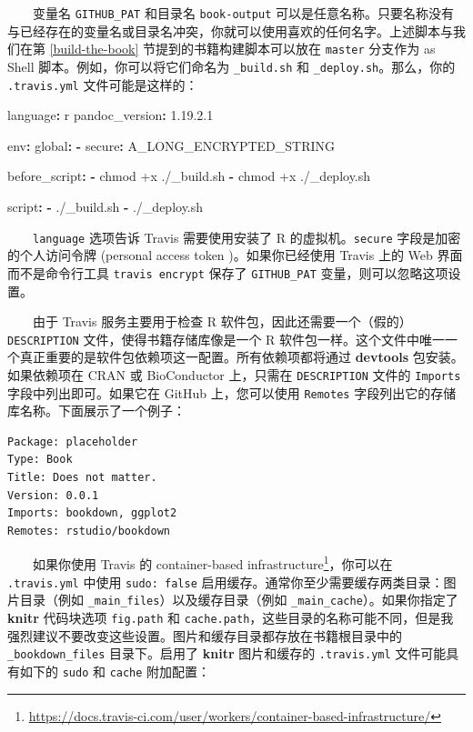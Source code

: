\documentclass[
  12pt,
]{krantz}
\newenvironment{Shaded}{\begin{snugshade}}{\end{snugshade}}
\newcommand{\AttributeTok}[1]{\textcolor[rgb]{0.77,0.63,0.00}{#1}}
\newcommand{\FloatTok}[1]{\textcolor[rgb]{0.00,0.00,0.81}{#1}}
\newcommand{\FunctionTok}[1]{\textcolor[rgb]{0.00,0.00,0.00}{#1}}
\newcommand{\KeywordTok}[1]{\textcolor[rgb]{0.13,0.29,0.53}{\textbf{#1}}}
\renewcommand{\href}[2]{#2\footnote{\url{#1}}}
\theoremstyle{definition}
\theoremstyle{definition}
\theoremstyle{definition}
\theoremstyle{definition}
\theoremstyle{remark}
\begin{document}
  变量名 \texttt{GITHUB\_PAT} 和目录名 \texttt{book-output} 可以是任意名称。只要名称没有与已经存在的变量名或目录名冲突，你就可以使用喜欢的任何名字。上述脚本与我们在第 \ref{build-the-book} 节提到的书籍构建脚本可以放在 \texttt{master} 分支作为 as Shell 脚本。例如，你可以将它们命名为 \texttt{\_build.sh} 和 \texttt{\_deploy.sh}。那么，你的 \texttt{.travis.yml} 文件可能是这样的：

\begin{Shaded}
\begin{Highlighting}[]
\FunctionTok{language}\KeywordTok{:}\AttributeTok{ r}
\FunctionTok{pandoc\_version}\KeywordTok{:}\AttributeTok{ }\FloatTok{1.19.2.1}

\FunctionTok{env}\KeywordTok{:}
\AttributeTok{  }\FunctionTok{global}\KeywordTok{:}
\AttributeTok{    }\KeywordTok{{-}}\AttributeTok{ }\FunctionTok{secure}\KeywordTok{:}\AttributeTok{ A\_LONG\_ENCRYPTED\_STRING}

\FunctionTok{before\_script}\KeywordTok{:}
\AttributeTok{  }\KeywordTok{{-}}\AttributeTok{ chmod +x ./\_build.sh}
\AttributeTok{  }\KeywordTok{{-}}\AttributeTok{ chmod +x ./\_deploy.sh}

\FunctionTok{script}\KeywordTok{:}
\AttributeTok{  }\KeywordTok{{-}}\AttributeTok{ ./\_build.sh}
\AttributeTok{  }\KeywordTok{{-}}\AttributeTok{ ./\_deploy.sh}
\end{Highlighting}
\end{Shaded}

  \texttt{language} 选项告诉 Travis 需要使用安装了 R 的虚拟机。\texttt{secure} 字段是加密的个人访问令牌 (personal access token )。如果你已经使用 Travis 上的 Web 界面而不是命令行工具 \texttt{travis\ encrypt} 保存了 \texttt{GITHUB\_PAT} 变量，则可以忽略这项设置。

  由于 Travis 服务主要用于检查 R 软件包，因此还需要一个（假的）\texttt{DESCRIPTION} 文件，使得书籍存储库像是一个 R 软件包一样。这个文件中唯一一个真正重要的是软件包依赖项这一配置。所有依赖项都将通过 \textbf{devtools} 包安装。如果依赖项在 CRAN 或 BioConductor 上，只需在 \texttt{DESCRIPTION} 文件的 \texttt{Imports} 字段中列出即可。如果它在 GitHub 上，您可以使用 \texttt{Remotes} 字段列出它的存储库名称。下面展示了一个例子：

\begin{verbatim}
Package: placeholder
Type: Book
Title: Does not matter.
Version: 0.0.1
Imports: bookdown, ggplot2
Remotes: rstudio/bookdown
\end{verbatim}

  如果你使用 Travis 的 \href{https://docs.travis-ci.com/user/workers/container-based-infrastructure/}{container-based infrastructure}，你可以在 \texttt{.travis.yml} 中使用 \texttt{sudo:\ false} 启用缓存。通常你至少需要缓存两类目录：图片目录（例如 \texttt{\_main\_files}）以及缓存目录（例如 \texttt{\_main\_cache}）。如果你指定了 \textbf{knitr} 代码块选项 \texttt{fig.path} 和 \texttt{cache.path}，这些目录的名称可能不同，但是我强烈建议不要改变这些设置。图片和缓存目录都存放在书籍根目录中的 \texttt{\_bookdown\_files} 目录下。启用了 \textbf{knitr} 图片和缓存的 \texttt{.travis.yml} 文件可能具有如下的 \texttt{sudo} 和 \texttt{cache} 附加配置：
\end{document}
